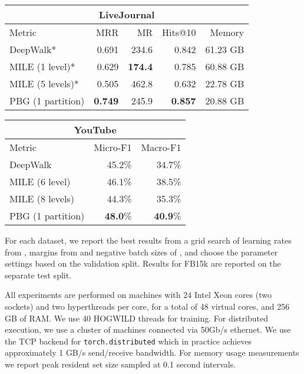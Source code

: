 \documentclass{article}
\begin{document}
\begin{table*}[t]
\centering
\begin{tabular}{l r r r r}
\hline
\multicolumn{5}{c}{\textbf{LiveJournal}} \\\hline
Metric & MRR & MR & Hits@10	& Memory\\\hline
DeepWalk* & 0.691 & 234.6 & 0.842 & 61.23 GB \\
MILE (1 level)* & 0.629 & \textbf{174.4} & 0.785 & 60.88 GB\\
MILE (5 levels)* & 0.505 & 462.8 & 0.632 & 22.78 GB
\\\hline
PBG (1 partition) & \textbf{0.749} & 245.9 & \textbf{0.857} & 20.88 GB
\\\hline 
\end{tabular}
\quad
\begin{tabular}{l r r}
\hline
\multicolumn{3}{c}{\textbf{YouTube}} \\\hline
Metric & Micro-F1 & Macro-F1 \\\hline
DeepWalk & 45.2\% & 34.7\% \\
MILE (6 level) & 46.1\% & 38.5\% \\
MILE (8 levels) & 44.3\% & 35.3\%
\\\hline
PBG (1 partition) & \textbf{48.0}\% & \textbf{40.9}\% 
\\\hline 
\end{tabular}
\caption{\label{tab:livejournal} Performance of PBG, DeepWalk, and MILE on the LiveJournal dataset and the YouTube dataset. \textbf{Left:} Link prediction evaluation and peak memory usage for the trained embeddings of the LiveJournal dataset and YouTube dataset. The ranking metrics on the test set are obtained by ranking positive edges among randomly sampled corrupted edges. \textbf{Right:} Micro-f1 and Macro-f1 on the user categories prediction task of the YouTube dataset when using learned embeddings as features. \textbf{*} Results obtained running software provided by the original authors.  Results reported in \cite{liang2018mile}.
\label{tab:livejournal-result}
}
\end{table*}

For each dataset, we report the best results from a grid search of learning rates from , margins from  and negative batch sizes of , and choose the parameter settings based on the validation split. Results for FB15k are reported on the separate test split. 

All experiments are performed on machines with 24 Intel\textsuperscript{\textregistered} Xeon\textsuperscript{\textregistered} cores (two sockets) and two hyperthreads per core, for a total of 48 virtual cores, and 256 GB of RAM. We use 40 HOGWILD threads for training. For distributed execution, we use a cluster of machines connected via 50Gb/s ethernet. We use the TCP backend for \texttt{torch.distributed} which in practice achieves approximately 1 GB/s send/receive bandwidth. For memory usage measurements we report peak resident set size sampled at 0.1 second intervals.
\end{document}
